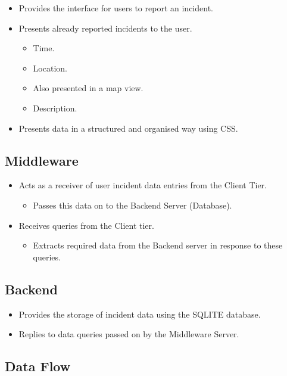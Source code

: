\documentclass{sig-alt-release2}
\begin{document}
\begin{itemize}
\item    Provides the interface for users to report an incident.
\item    Presents already reported incidents to the user.
\begin{itemize}
\item        Time.
\item        Location.
\item            Also presented in a map view.
\item        Description.
\end{itemize}
\item    Presents data in a structured and organised way using CSS.
\end{itemize}

\subsection{Middleware}

\begin{itemize}
\item    Acts as a receiver of user incident data entries from the Client Tier.
\begin{itemize}
\item        Passes this data on to the Backend Server (Database).
\end{itemize}
\item    Receives queries from the Client tier.
\begin{itemize}
\item        Extracts required data from the Backend server in response to these queries.
\end{itemize}
\end{itemize}

\subsection{Backend}


\begin{itemize}
\item    Provides the storage of incident data using the SQLITE database.
\item    Replies to data queries passed on by the Middleware Server.
\end{itemize}

\subsection{Data Flow}
\end{document}
